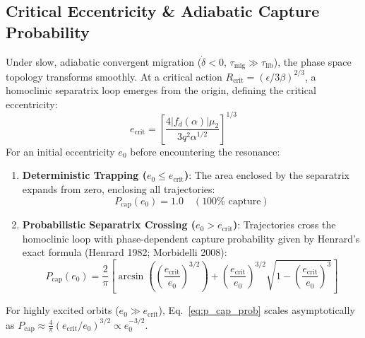 \documentclass[11pt,a4paper]{article}
\begin{document}
\subsection{Critical Eccentricity \& Adiabatic Capture Probability}
Under slow, adiabatic convergent migration ($\dot{\delta} < 0$, $\tau_{\text{mig}} \gg \tau_{\text{lib}}$), the phase space topology transforms smoothly. At a critical action $R_{\text{crit}} = (\epsilon / 3\beta)^{2/3}$, a homoclinic separatrix loop emerges from the origin, defining the critical eccentricity:
\begin{equation}
e_{\text{crit}} = \left[ \frac{4 |f_d(\alpha)| \mu_2}{3 q^2 \alpha^{1/2}} \right]^{1/3}
\label{eq:e_crit}
\end{equation}
For an initial eccentricity $e_0$ before encountering the resonance:
\begin{enumerate}
    \item \textbf{Deterministic Trapping ($e_0 \le e_{\text{crit}}$)}: The area enclosed by the separatrix expands from zero, enclosing all trajectories:
    \begin{equation}
    P_{\text{cap}}(e_0) = 1.0 \quad (100\% \text{ capture})
    \label{eq:p_cap_100}
    \end{equation}
    \item \textbf{Probabilistic Separatrix Crossing ($e_0 > e_{\text{crit}}$)}: Trajectories cross the homoclinic loop with phase-dependent capture probability given by Henrard's exact formula (Henrard 1982; Morbidelli 2008):
    \begin{equation}
    P_{\text{cap}}(e_0) = \frac{2}{\pi} \left[ \arcsin\left( \left(\frac{e_{\text{crit}}}{e_0}\right)^{3/2} \right) + \left(\frac{e_{\text{crit}}}{e_0}\right)^{3/2} \sqrt{1 - \left(\frac{e_{\text{crit}}}{e_0}\right)^3} \right]
    \label{eq:p_cap_prob}
    \end{equation}
\end{enumerate}
For highly excited orbits ($e_0 \gg e_{\text{crit}}$), Eq.~\eqref{eq:p_cap_prob} scales asymptotically as $P_{\text{cap}} \approx \frac{4}{\pi} (e_{\text{crit}}/e_0)^{3/2} \propto e_0^{-3/2}$.
\end{document}
